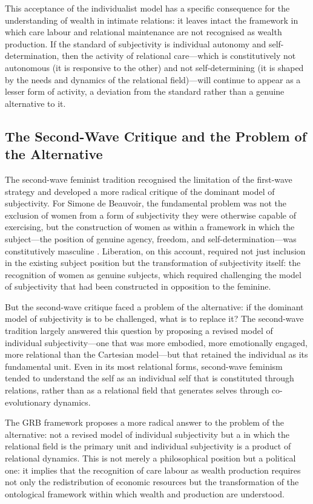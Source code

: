 This acceptance of the individualist model has a specific consequence for the understanding of wealth in intimate relations: it leaves intact the framework in which care labour and relational maintenance are not recognised as wealth production. If the standard of subjectivity is individual autonomy and self-determination, then the activity of relational care---which is constitutively not autonomous (it is responsive to the other) and not self-determining (it is shaped by the needs and dynamics of the relational field)---will continue to appear as a lesser form of activity, a deviation from the standard rather than a genuine alternative to it.

\subsection{The Second-Wave Critique and the Problem of the Alternative}
\label{p15:subsec:secondwave}

\noindent
The second-wave feminist tradition recognised the limitation of the first-wave strategy and developed a more radical critique of the dominant model of subjectivity. For Simone de Beauvoir, the fundamental problem was not the exclusion of women from a form of subjectivity they were otherwise capable of exercising, but the construction of women as  within a framework in which the subject---the position of genuine agency, freedom, and self-determination---was constitutively masculine \parencite{held2006}. Liberation, on this account, required not just inclusion in the existing subject position but the transformation of subjectivity itself: the recognition of women as genuine subjects, which required challenging the model of subjectivity that had been constructed in opposition to the feminine.

But the second-wave critique faced a problem of the alternative: if the dominant model of subjectivity is to be challenged, what is to replace it? The second-wave tradition largely answered this question by proposing a revised model of individual subjectivity---one that was more embodied, more emotionally engaged, more relational than the Cartesian model---but that retained the individual as its fundamental unit. Even in its most relational forms, second-wave feminism tended to understand the self as an individual self that is constituted through relations, rather than as a relational field that generates selves through co-evolutionary dynamics.

The GRB framework proposes a more radical answer to the problem of the alternative: not a revised model of individual subjectivity but a  in which the relational field is the primary unit and individual subjectivity is a product of relational dynamics. This is not merely a philosophical position but a political one: it implies that the recognition of care labour as wealth production requires not only the redistribution of economic resources but the transformation of the ontological framework within which wealth and production are understood.

